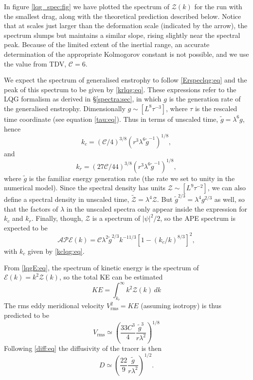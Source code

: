 \documentclass{jfm}
\newcommand{\ca}  [1]{\mathcal{#1}}
\newcommand{\rms} {\mathrm{rms}}
\begin{document}
In figure \ref{lqg_spec:fig} we have plotted the spectrum of
$\ca{Z}(k)$ for the run with the smallest drag, along with the
theoretical prediction described below.  Notice that at scales just
larger than the deformation scale (indicated by the arrow), the
spectrum slumps but maintains a similar slope, rising slightly near
the spectral peak.  Because of the limited extent of the inertial
range, an accurate determination of the appropriate Kolmogorov
constant is not possible, and we use the value from TDV, $\ca{C}= 6$.

We expect the spectrum of generalised enstrophy to follow
\eqref{Erspeclqg:eq} and the peak of this spectrum to be given by
\eqref{krlqg:eq}.  These expressions refer to the LQG formalism
as derived in \S \ref{spectra:sec}, in which $g$ is the
generation rate of the generalised enstrophy.  Dimensionally $g
\sim [L^8\tau^{-3}]$, where $\tau$ is the rescaled time
coordinate (see equation \ref{tau:eq}).  Thus in terms of
unscaled time, $\tilde{g} = \lambda^6g$, hence
\begin{equation}
k_c = \left(\ca{C}/4\right)^{3/8}
\left(r^3\lambda^6\tilde{g}^{-1}\right)^{1/8},
\label{kclqg:eq}
\end{equation}
and
\begin{equation}
k_r = \left(27\ca{C}/44\right)^{3/8}
\left(r^3\lambda^6\tilde{g}^{-1}\right)^{1/8},
\label{kr2lqg:eq}
\end{equation}
where $\tilde{g}$ is the familiar energy generation rate (the rate we
set to unity in the numerical model).  Since the spectral density has
units $\ca{Z} \sim [L^9\tau^{-2}]$, we can also define a spectral
density in unscaled time, $\tilde{\ca{Z}} = \lambda^4\ca{Z}$.  But
$\tilde{g}^{2/3} = \lambda^{4}g^{2/3}$ as well, so that the factors of
$\lambda$ in the unscaled spectra only appear inside the expression
for $k_c$ and $k_r$.  Finally, though, $\ca{Z}$ is a spectrum of
$|\psi|^2/2$, so the APE spectrum is expected to be
\begin{equation}
\ca{APE}(k) = \ca{C}\lambda^2\tilde{g}^{2/3}k^{-11/3}
\left[1-\left(k_c/k\right)^{8/3}\right]^2,
\label{APEspeclqg:eq}
\end{equation}
with $k_c$ given by \eqref{kclqg:eq}.

From \eqref{lqgE:eq}, the spectrum of kinetic energy is the
spectrum of $\ca{E}(k) = k^2\ca{Z}(k)$, so the total KE can be
estimated
\begin{equation}
KE = \int_{k_r}^{\infty}k^2\ca{Z}(k)\, dk
\label{KElqg:eq}
\end{equation}
The rms eddy meridional velocity $V_{\rms}^2 = KE$ (assuming isotropy)
is thus predicted to be
\begin{equation}
V_{\rms}\simeq \left(\frac{33 C^3}{4}\frac{\tilde{g}^3}{r\lambda^2}\right)^{1/8}
\label{Vlqg:eq}
\end{equation}
Following \eqref{diff:eq} the diffusivity of the tracer is then
\begin{equation}
D \simeq \left(\frac{22}{9}\frac{\tilde{g}}{r\lambda^{2}}\right)^{1/2}.
\label{Dlqg:eq}
\end{equation}
\end{document}
